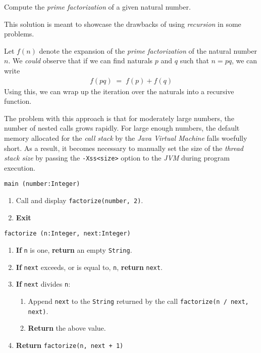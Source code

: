 

\problem Compute the \textit{prime factorization} of a given natural number.

\solution
This solution is meant to showcase the drawbacks of using \textit{recursion} in some problems.
\par
Let $f(n)$ denote the expansion of the \textit{prime factorization} of the natural number $n$. We \textit{could} observe
that if we can find naturals $p$ and $q$ such that $n = pq$, we can write
\begin{align*}
	f(pq) \;=\; f(p) + f(q)
\end{align*}
Using this, we can wrap up the iteration over the naturals into a recursive function.
\par
The problem with this approach is that for moderately large numbers, the number of nested calls grows rapidly.
For large enough numbers, the default memory allocated for the \textit{call stack} by the \textit{Java Virtual Machine} falls woefully short.
As a result, it becomes necessary to manually set the size of the \textit{thread stack size} by passing the \texttt{-Xss<size>} option
to the \textit{JVM} during program execution. 

\algorithm
\texttt{main (number:Integer)}
\begin{enumerate}
	\item Call and display \texttt{factorize(number, 2)}.
	\item \textbf{Exit} 
\end{enumerate}
\vspace{5mm}
\texttt{factorize (n:Integer, next:Integer)}
\begin{enumerate}
	\item \textbf{If} \texttt{n} is one, \textbf{return} an empty \texttt{String}.
	\item \textbf{If} \texttt{next} exceeds, or is equal to, \texttt{n}, \textbf{return} \texttt{next}.
	\item \textbf{If} \texttt{next} divides \texttt{n}:
	\begin{enumerate}
		\item Append \texttt{next} to the \texttt{String} returned by the call \texttt{factorize(n / next, next)}.
		\item \textbf{Return}  the above value.
	\end{enumerate}
	\item \textbf{Return} \texttt{factorize(n, next + 1)} 
\end{enumerate}

